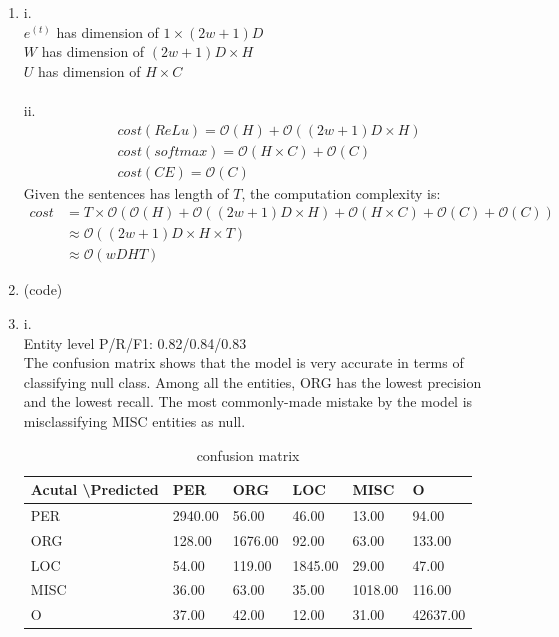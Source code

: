 \documentclass[10pt]{article}
\begin{document}
\begin{enumerate}[label=(\alph*)]
\item
i.\\
$e^{(t)}$ has dimension of $1 \times (2w+1)D$\\
$W$ has dimension of $(2w+1)D \times H$\\
$U$ has dimension of $H \times C$\\
\\
ii.\\
$$
\begin{aligned}
& cost(ReLu) = \mathcal{O}(H) + \mathcal{O}((2w+1)D \times H)\\
& cost(softmax) = \mathcal{O}(H \times C) + \mathcal{O}(C)\\
& cost(CE) = \mathcal{O}(C)
\end{aligned}
$$
Given the sentences has length of $T$, the computation complexity is:
$$
\begin{aligned}
cost
& = T \times \mathcal{O}(\mathcal{O}(H) + \mathcal{O}((2w+1)D \times H) + \mathcal{O}(H \times C) + \mathcal{O}(C) + \mathcal{O}(C))\\
& \approx \mathcal{O}((2w+1)D \times H \times T)\\
& \approx \mathcal{O}(wDHT)
\end{aligned}
$$

\item
(code)

\item
i.\\
Entity level P/R/F1: 0.82/0.84/0.83\\
The confusion matrix shows that the model is very accurate in terms of classifying null class. Among all the entities,  ORG has the lowest precision and the lowest recall. The most commonly-made mistake by the model is misclassifying MISC entities as null.
\begin{table}[h]
	\centering
	\caption{confusion matrix}
	\begin{tabular}{|l|l|l|l|l|l|}
	\hline
	Acutal \textbackslash Predicted & PER     & ORG     & LOC     & MISC    & O        \\ \hline
	PER   & 2940.00 & 56.00   & 46.00   & 13.00   & 94.00    \\ \hline
	ORG   & 128.00  & 1676.00 & 92.00   & 63.00   & 133.00   \\ \hline
	LOC   & 54.00   & 119.00  & 1845.00 & 29.00   & 47.00    \\ \hline
	MISC  & 36.00   & 63.00   & 35.00   & 1018.00 & 116.00   \\ \hline
	O     & 37.00   & 42.00   & 12.00   & 31.00   & 42637.00 \\ \hline
	\end{tabular}
\end{table}


\end{enumerate}
\end{document}
